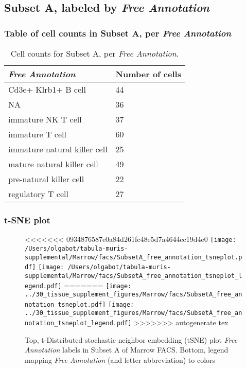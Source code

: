 \clearpage

\subsection{Subset A, labeled by \emph{Free Annotation}}
\subsubsection{Table of cell counts in Subset A, per \emph{Free Annotation}}\begin{table}[h]
\centering
\label{my-label}
\begin{tabular}{@{}ll@{}}
\toprule

\emph{Free Annotation}& Number of cells \\ \midrule
Cd3e+ Klrb1+ B cell & 44 \\

NA & 36 \\

immature NK T cell & 37 \\

immature T cell & 60 \\

immature natural killer cell & 25 \\

mature natural killer cell & 49 \\

pre-natural killer cell & 22 \\

regulatory T cell & 27 \\
\bottomrule
\end{tabular}
\caption{Cell counts for Subset A, per \emph{Free Annotation}.}
\end{table}

\clearpage
\subsubsection{t-SNE plot}
\begin{figure}[h]
\centering
<<<<<<< 0934876587e0a84d261fc48e5d7a4644ec19d4e0
\texttt{[image: /Users/olgabot/tabula-muris-supplemental/Marrow/facs/SubsetA\_free\_annotation\_tsneplot.pdf]}
\texttt{[image: /Users/olgabot/tabula-muris-supplemental/Marrow/facs/SubsetA\_free\_annotation\_tsneplot\_legend.pdf]}
=======
\texttt{[image: ../30\_tissue\_supplement\_figures/Marrow/facs/SubsetA\_free\_annotation\_tsneplot.pdf]}
\texttt{[image: ../30\_tissue\_supplement\_figures/Marrow/facs/SubsetA\_free\_annotation\_tsneplot\_legend.pdf]}
>>>>>>> autogenerate tex
\caption{Top, t-Distributed stochastic neighbor embedding (tSNE) plot  \emph{Free Annotation} labels in Subset A of Marrow FACS. Bottom, legend mapping \emph{Free Annotation} (and letter abbreviation) to colors}
\end{figure}


